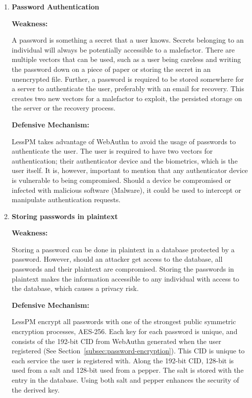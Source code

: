 \begin{enumerate}[label=$\blacktriangleright$]
  \item \textbf{Password Authentication}

  \textbf{Weakness:}

  A password is something a secret that a user knows.
  Secrets belonging to an individual will always be potentially accessible to
  a malefactor.
  There are multiple vectors that can be used, such as a user being careless
  and writing the password down on a piece of paper or storing the secret in an
  unencrypted file.
  Further, a password is required to be stored somewhere for a server to
  authenticate the user, preferably with an email for recovery.
  This creates two new vectors for a malefactor to exploit, the persisted
  storage on the server or the recovery process.

  \textbf{Defensive Mechanism:}

  LessPM takes advantage of WebAuthn to avoid the usage of passwords to
  authenticate the user.
  The user is required to have two vectors for authentication; their
  authenticator device and the biometrics, which is the user itself.
  It is, however, important to mention that any authenticator device is
  vulnerable to being compromised.
  Should a device be compromised or infected with malicious software (Malware),
  it could be used to intercept or manipulate authentication requests.

  \item \textbf{Storing passwords in plaintext}

  \textbf{Weakness:}

  Storing a password can be done in plaintext in a database protected by a
  password.
  However, should an attacker get access to the database, all passwords and
  their plaintext are compromised.
  Storing the passwords in plaintext makes the information accessible to any
  individual with access to the database, which causes a privacy risk.

  \textbf{Defensive Mechanism:}

  LessPM encrypt all passwords with one of the strongest public symmetric
  encryption processes, AES-256.
  Each key for each password is unique, and consists of the 192-bit CID from
  WebAuthn generated when the user registered (See
  Section~\ref{subsec:password-encryption}).
  This CID is unique to each service the user is registered with.
  Along the 192-bit CID, 128-bit is used from a salt and 128-bit used from a
  pepper.
  The salt is stored with the entry in the database.
  Using both salt and pepper enhances the security of the derived key.


\end{enumerate}
